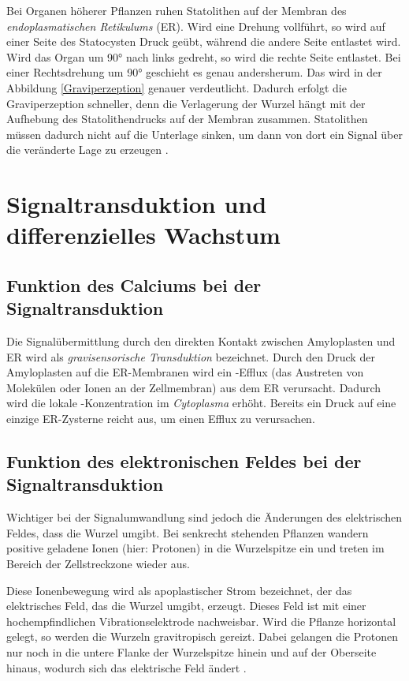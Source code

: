 \documentclass[
11pt, 
ngerman,
listof=totocnumbered,
oneside,
bibliography=totocnumbered,
abstracton
]{scrreprt}
\begin{document}
Bei Organen höherer Pflanzen ruhen Statolithen auf der Membran des \emph{endoplasmatischen Retikulums} (ER). Wird eine Drehung vollführt, so wird auf einer Seite des Statocysten Druck geübt, während die andere Seite entlastet wird. Wird das Organ um \ang{90} nach links gedreht, so wird die rechte Seite entlastet. Bei einer Rechtsdrehung um \ang{90} geschieht es genau andersherum. Das wird in der Abbildung \ref{Graviperzeption} genauer verdeutlicht.
Dadurch erfolgt die Graviperzeption schneller, denn die Verlagerung der Wurzel hängt mit der Aufhebung des Statolithendrucks auf der Membran zusammen. Statolithen müssen dadurch nicht auf die Unterlage sinken, um dann von dort ein Signal über die veränderte Lage zu erzeugen \parencite[531--532]{Luettge}. 


\section{Signaltransduktion und differenzielles Wachstum}

\subsection{Funktion des Calciums bei der Signaltransduktion}

Die Signalübermittlung durch den direkten Kontakt zwischen Amyloplasten und ER wird als \emph{gravisensorische Transduktion} bezeichnet.
Durch den Druck der Amyloplasten auf die ER-Membranen wird ein -Efflux (das Austreten von Molekülen oder Ionen an der Zellmembran) aus dem ER verursacht.
Dadurch wird die lokale -Konzentration im  \emph{Cytoplasma} erhöht. 
Bereits ein Druck auf eine einzige ER-Zysterne reicht aus, um einen Efflux zu verursachen.

\subsection{Funktion des elektronischen Feldes bei der Signaltransduktion}

Wichtiger bei der Signalumwandlung sind jedoch die Änderungen des elektrischen Feldes, dass die Wurzel umgibt.
Bei senkrecht stehenden Pflanzen wandern positive geladene Ionen (hier: Protonen) in die Wurzelspitze ein und treten im Bereich der Zellstreckzone wieder aus.

Diese Ionenbewegung wird als apoplastischer Strom bezeichnet, der das elektrisches Feld, das die Wurzel umgibt, erzeugt. Dieses Feld ist mit einer hochempfindlichen Vibrationselektrode nachweisbar. 
Wird die Pflanze horizontal gelegt, so werden die Wurzeln gravitropisch gereizt. Dabei gelangen die Protonen nur noch in die untere Flanke der Wurzelspitze hinein und auf der Oberseite hinaus, wodurch sich das elektrische Feld ändert \parencite[502--503]{Nultsch}.
\end{document}
